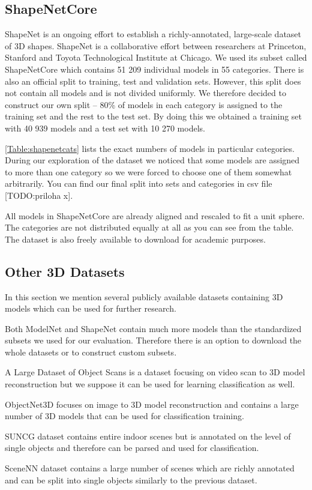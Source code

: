 \subsection{ShapeNetCore}
ShapeNet \cite{chang_shapenet:_2015} is an ongoing effort to establish a richly-annotated, large-scale dataset of 3D shapes. ShapeNet is a collaborative effort between researchers at Princeton, Stanford and Toyota Technological Institute at Chicago. We used its subset called ShapeNetCore which contains 51 209 individual models in 55 categories. There is also an official split to training, test and validation sets. However, this split does not contain all models and is not divided uniformly. We therefore decided to construct our own split -- 80\% of models in each category is assigned to the training set and the rest to the test set. By doing this we obtained a training set with 40 939 models and a test set with 10 270 models. \par \autoref{Table:shapenetcats} lists the exact numbers of models in particular categories. During our exploration of the dataset we noticed that some models are assigned to more than one category so we were forced to choose one of them somewhat arbitrarily. You can find our final split into sets and categories in csv file [TODO:priloha x].\par
All models in ShapeNetCore are already aligned and rescaled to fit a unit sphere. The categories are not distributed equally at all as you can see from the table. The dataset is also freely available to download for academic purposes.




\subsection{Other 3D Datasets}
In this section we mention several publicly available datasets containing 3D models which can be used for further research. \par
Both ModelNet and ShapeNet contain much more models than the standardized subsets we used for our evaluation. Therefore there is an option to download the whole datasets or to construct custom subsets. \par
A Large Dataset of Object Scans \cite{choi_large_2016} is a dataset focusing on video scan to 3D model reconstruction but we suppose it can be used for learning classification as well.  \par
ObjectNet3D \cite{xiang_objectnet3d:_2016} focuses on image to 3D model reconstruction and contains a large number of 3D models that can be used for classification training.\par
SUNCG dataset \cite{song_semantic_2017} contains entire indoor scenes but is annotated on the level of single objects and therefore can be parsed and used for classification. \par
SceneNN \cite{hua_scenenn:_2016} dataset contains a large number of scenes which are richly annotated and can be split into single objects similarly to the previous dataset.

